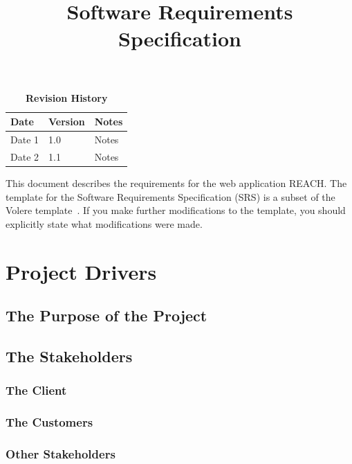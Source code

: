 \documentclass[12pt, titlepage]{article}
\title{Software Requirements Specification\\\progname}
\author{\authname}
\date{}
\begin{document}
\maketitle

\tableofcontents
\listoftables
\listoffigures

\begin{table}[bp]
\caption{\bf Revision History}
\begin{tabularx}{\textwidth}{p{3cm}p{2cm}X}
\toprule {\bf Date} & {\bf Version} & {\bf Notes}\\
\midrule
Date 1 & 1.0 & Notes\\
Date 2 & 1.1 & Notes\\
\bottomrule
\end{tabularx}
\end{table}

\newpage


This document describes the requirements for the web application REACH. The template for the Software
Requirements Specification (SRS) is a subset of the Volere
template~\citep{RobertsonAndRobertson2012}.  If you make further modifications
to the template, you should explicitly state what modifications were made.

\section{Project Drivers}

\subsection{The Purpose of the Project}

\subsection{The Stakeholders}

\subsubsection{The Client}

\subsubsection{The Customers}

\subsubsection{Other Stakeholders}
\end{document}
